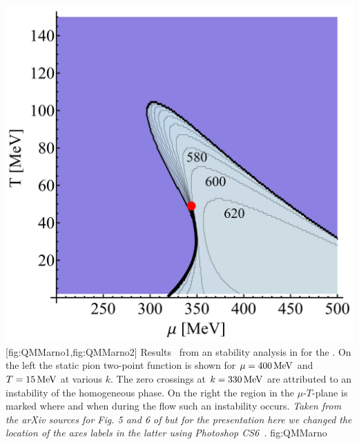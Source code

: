 	{\vspace{-0.15cm}\hspace{0.8cm}\includegraphics[width=\subcaptionFigureWidth-1.3cm]{inhomo/figures/PhysRevD.97.034022Fig6.png}} %
	[fig:QMMarno1,fig:QMMarno2]
	{%
		Results~\cite{Tripolt:2017zgc} from an \frg{} stability analysis in \lpa{} for the \qmm{}.
		On the left  the static pion two-point function is shown for $\mu=400\,\mathrm{MeV}$ and $T=15\,\mathrm{MeV}$ at various \rgscales{} $k$.
		The zero crossings at $k=330\,\mathrm{MeV}$ are attributed to an instability of the homogeneous phase.
		On the right  the region in the $\mu$-$T$-plane is marked where and when during the \frg{} flow such an instability occurs.
		\textit{Taken from the arXiv sources for Fig. 5 and 6 of  but for the presentation here we changed the location of the axes labels in the latter using Photoshop CS6~\cite{photoshopCS6}.}
	}%
	{fig:QMMarno}